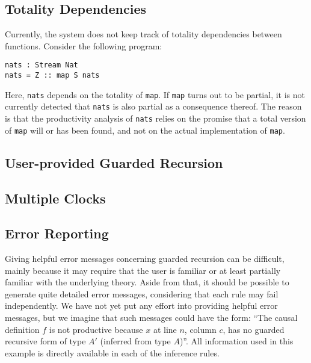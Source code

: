 \subsection{Totality Dependencies}
Currently, the system does not keep track of totality dependencies between
functions. Consider the following program:
\begin{lstlisting}[mathescape]
nats : Stream Nat
nats = Z :: map S nats
\end{lstlisting}
Here, \texttt{nats} depends on the totality of \texttt{map}. If \texttt{map}
turns out to be partial, it is not currently detected that \texttt{nats} is also
partial as a consequence thereof. The reason is that the productivity analysis
of \texttt{nats} relies on the promise that a total version of \texttt{map} will
or has been found, and not on the actual implementation of \texttt{map}.

\subsection{User-provided Guarded Recursion}

\subsection{Multiple Clocks}


\subsection{Error Reporting}
Giving helpful error messages concerning guarded recursion can be difficult,
mainly because it may require that the user is familiar or at least partially
familiar with the underlying theory. Aside from that, it should be possible to
generate quite detailed error messages, considering that each rule may fail
independently. We have not yet put any effort into providing helpful error
messages, but we imagine that such messages could have the form: ``The causal
definition $f$ is not productive because $x$ at line $n$, column $c$, has no
guarded recursive form of type $A'$ (inferred from type $A$)''. All information
used in this example is directly available in each of the inference rules.






